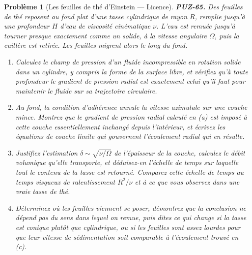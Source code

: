 \documentclass[11pt]{article}
\newtheorem{problem}{Problème}
\begin{document}
\begin{problem}[{Les feuilles de thé d'Einstein --- Licence}]
\textbf{PUZ-65.} Des feuilles de thé reposent au fond plat d'une tasse cylindrique de
rayon $ R $, remplie jusqu'à une profondeur $ H $ d'eau de viscosité cinématique
$ \nu $. L'eau est remuée jusqu'à tourner presque exactement comme un solide, à la vitesse
angulaire $ \Omega $, puis la cuillère est retirée. Les feuilles migrent alors le long du
fond.
\begin{enumerate}
\item[(a)] Calculez le champ de pression d'un fluide incompressible en rotation solide dans un
cylindre, y compris la forme de la surface libre, et vérifiez qu'à toute profondeur le
gradient de pression radial est exactement celui qu'il faut pour maintenir le fluide sur sa
trajectoire circulaire.
\item[(b)] Au fond, la condition d'adhérence annule la vitesse azimutale sur une couche mince.
Montrez que le gradient de pression radial calculé en (a) est imposé à cette couche
essentiellement inchangé depuis l'intérieur, et écrivez les équations de couche limite qui
gouvernent l'écoulement radial qui en résulte.
\item[(c)] Justifiez l'estimation $ \delta \sim \sqrt{\nu/\Omega} $ de l'épaisseur de la couche,
calculez le débit volumique qu'elle transporte, et déduisez-en l'échelle de temps sur
laquelle tout le contenu de la tasse est retourné. Comparez cette échelle de temps au temps
visqueux de ralentissement $ R^{2}/\nu $ et à ce que vous observez dans une vraie tasse de
thé.
\item[(d)] Déterminez où les feuilles viennent se poser, démontrez que la conclusion ne dépend pas
du sens dans lequel on remue, puis dites ce qui change si la tasse est conique plutôt que
cylindrique, ou si les feuilles sont assez lourdes pour que leur vitesse de sédimentation
soit comparable à l'écoulement trouvé en (c).
\end{enumerate}

\end{problem}
\end{document}
